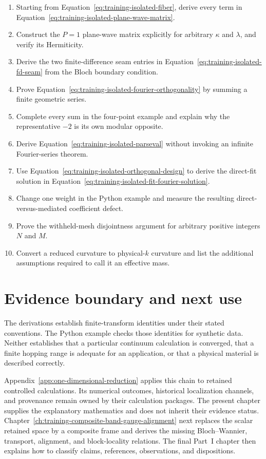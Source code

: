 \begin{enumerate}
  \item Starting from Equation~\eqref{eq:training-isolated-fiber}, derive every
        term in Equation~\eqref{eq:training-isolated-plane-wave-matrix}.
  \item Construct the $P=1$ plane-wave matrix explicitly for arbitrary
        $\kappa$ and $\lambda$, and verify its Hermiticity.
  \item Derive the two finite-difference seam entries in
        Equation~\eqref{eq:training-isolated-fd-seam} from the Bloch boundary
        condition.
  \item Prove Equation~\eqref{eq:training-isolated-fourier-orthogonality} by
        summing a finite geometric series.
  \item Complete every sum in the four-point example and explain why the
        representative $-2$ is its own modular opposite.
  \item Derive Equation~\eqref{eq:training-isolated-parseval} without invoking
        an infinite Fourier-series theorem.
  \item Use Equation~\eqref{eq:training-isolated-orthogonal-design} to derive
        the direct-fit solution in
        Equation~\eqref{eq:training-isolated-fit-fourier-solution}.
  \item Change one weight in the Python example and measure the resulting
        direct-versus-mediated coefficient defect.
  \item Prove the withheld-mesh disjointness argument for arbitrary positive
        integers $N$ and $M$.
  \item Convert a reduced curvature to physical-$k$ curvature and list the
        additional assumptions required to call it an effective mass.
\end{enumerate}

\section{Evidence boundary and next use}

The derivations establish finite-transform identities under their stated
conventions. The Python example checks those identities for synthetic data.
Neither establishes that a particular continuum calculation is converged, that
a finite hopping range is adequate for an application, or that a physical
material is described correctly.

Appendix~\ref{app:one-dimensional-reduction} applies this chain to retained
controlled calculations. Its numerical outcomes, historical localization
channels, and provenance remain owned by their calculation packages. The
present chapter supplies the explanatory mathematics and does not inherit their
evidence status. Chapter~\ref{ch:training-composite-band-gauge-alignment} next
replaces the scalar retained space by a composite frame and derives the missing
Bloch--Wannier, transport, alignment, and block-locality relations. The final
Part~I chapter then explains how to classify claims, references, observations,
and dispositions.
